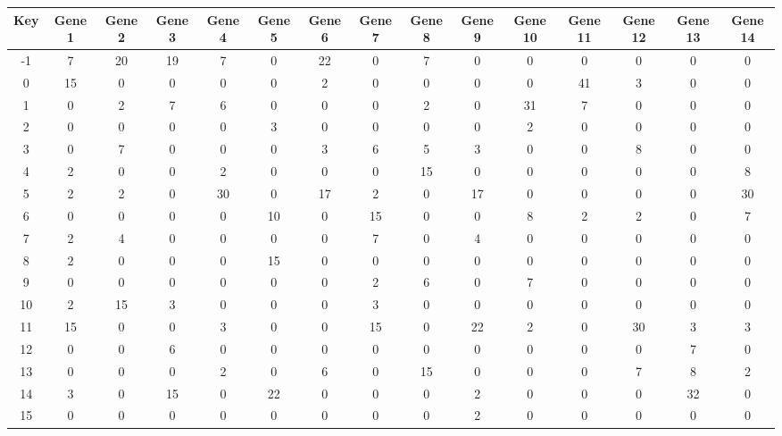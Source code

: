 \begin{tabular}{|c|c|c|c|c|c|c|c|c|c|c|c|c|c|c|}
\hline
Key & Gene 1 & Gene 2 & Gene 3 & Gene 4 & Gene 5 & Gene 6 & Gene 7 & Gene 8 & Gene 9 & Gene 10 & Gene 11 & Gene 12 & Gene 13 & Gene 14 \\
\hline
-1 & 7 & 20 & 19 & 7 & 0 & 22 & 0 & 7 & 0 & 0 & 0 & 0 & 0 & 0 \\
0 & 15 & 0 & 0 & 0 & 0 & 2 & 0 & 0 & 0 & 0 & 41 & 3 & 0 & 0 \\
1 & 0 & 2 & 7 & 6 & 0 & 0 & 0 & 2 & 0 & 31 & 7 & 0 & 0 & 0 \\
2 & 0 & 0 & 0 & 0 & 3 & 0 & 0 & 0 & 0 & 2 & 0 & 0 & 0 & 0 \\
3 & 0 & 7 & 0 & 0 & 0 & 3 & 6 & 5 & 3 & 0 & 0 & 8 & 0 & 0 \\
4 & 2 & 0 & 0 & 2 & 0 & 0 & 0 & 15 & 0 & 0 & 0 & 0 & 0 & 8 \\
5 & 2 & 2 & 0 & 30 & 0 & 17 & 2 & 0 & 17 & 0 & 0 & 0 & 0 & 30 \\
6 & 0 & 0 & 0 & 0 & 10 & 0 & 15 & 0 & 0 & 8 & 2 & 2 & 0 & 7 \\
7 & 2 & 4 & 0 & 0 & 0 & 0 & 7 & 0 & 4 & 0 & 0 & 0 & 0 & 0 \\
8 & 2 & 0 & 0 & 0 & 15 & 0 & 0 & 0 & 0 & 0 & 0 & 0 & 0 & 0 \\
9 & 0 & 0 & 0 & 0 & 0 & 0 & 2 & 6 & 0 & 7 & 0 & 0 & 0 & 0 \\
10 & 2 & 15 & 3 & 0 & 0 & 0 & 3 & 0 & 0 & 0 & 0 & 0 & 0 & 0 \\
11 & 15 & 0 & 0 & 3 & 0 & 0 & 15 & 0 & 22 & 2 & 0 & 30 & 3 & 3 \\
12 & 0 & 0 & 6 & 0 & 0 & 0 & 0 & 0 & 0 & 0 & 0 & 0 & 7 & 0 \\
13 & 0 & 0 & 0 & 2 & 0 & 6 & 0 & 15 & 0 & 0 & 0 & 7 & 8 & 2 \\
14 & 3 & 0 & 15 & 0 & 22 & 0 & 0 & 0 & 2 & 0 & 0 & 0 & 32 & 0 \\
15 & 0 & 0 & 0 & 0 & 0 & 0 & 0 & 0 & 2 & 0 & 0 & 0 & 0 & 0 \\
\hline
\end{tabular}